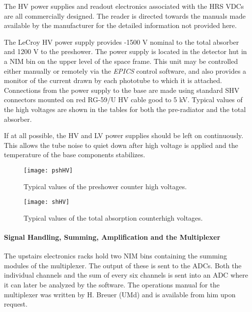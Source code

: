 The HV power supplies and readout electronics associated with the HRS
VDCs are all commercially designed.  The reader is directed towards
the manuals made available by the manufacturer for the detailed
information not provided here.

The LeCroy HV power supply provides -1500 V nominal to
the total absorber and 1200 V to the preshower.
The power supply is located in
the detector hut in a NIM bin on the upper level of the space frame.
This unit may be controlled either manually or remotely via the
{\it EPICS} control software, and also provides a monitor of the
current drawn by each phototube to which it is attached.
Connections from the power supply to the base are made using
standard SHV connectors mounted on red RG-59/U HV cable good to 5 kV.
Typical values of the high voltages are shown in the tables for both the 
pre-radiator and the total absorber.

If at all possible, the HV and LV power supplies should be left
on continuously.   This allows the tube noise to quiet down after high
voltage is applied and the temperature of the base components stabilizes.

\begin{figure}
\begin{center}
\texttt{[image: pshHV]}
{\linespread{1.}
\caption[Detectors: Pre-shower Counter HV]
{Typical values of the preshower counter high voltages.}
\label{fig:pre_hv}}
\end{center}
\end{figure}

\begin{figure}
\begin{center}
\texttt{[image: shHV]}
{\linespread{1.}
\caption[Detectors: Shower Counter HV]{Typical values of the
total absorption counterhigh voltages.}
\label{fig:ta_hv}}
\end{center}
\end{figure}

\paragraph{Signal Handling, Summing, Amplification and the Multiplexer}

The upstairs electronics racks hold two NIM bins containing the summing modules
of the multiplexer.  The output of these is sent to the ADCs.  Both the 
individual channels and the sum of every six channels is sent into an ADC 
where it can later be analyzed by the software.  The operations manual for 
the multiplexer was written by H. Breuer (UMd) and is available from him upon 
request.

